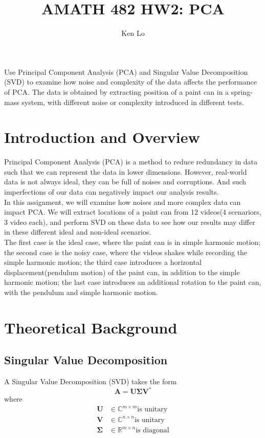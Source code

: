 \documentclass[12pt, a4paper]{article}
\begin{document}
\author{Ken Lo}
\title{AMATH 482 HW2: PCA}
\maketitle

\abstract
Use Principal Component Analysis (PCA) and Singular Value Decomposition (SVD) to examine how noise and complexity of the data affects the performance of PCA. The data is obtained by extracting position of a paint can in a spring-mass system, with different noise or complexity introduced in different tests.


\section{Introduction and Overview}
Principal Component Analysis (PCA) is a method to reduce redundancy in data such that we can represent the data in lower dimensions. However, real-world data is not always ideal, they can be full of noises and corruptions. And such imperfections of our data can negatively impact our analysis results.\\ 

In this assignment, we will examine how noises and more complex data can impact PCA. We will extract locations of a paint can from 12 videos(4 scenariors, 3 video each), and perform SVD on these data to see how our results may differ in these different ideal and non-ideal scenarios.\\

The first case is the ideal case, where the paint can is in simple harmonic motion; the second case is the noisy case, where the videos shakes while recording the simple harmonic motion; the third case introduces a horizontal displacement(pendulum motion) of the paint can, in addition to the simple harmonic motion; the last case introduces an additional rotation to the paint can, with the pendulum and simple harmonic motion.

\section{Theoretical Background}
\subsection{Singular Value Decomposition}
A Singular Value Decomposition (SVD) takes the form
$$\mathbf{A} = \mathbf{U\Sigma V^*}$$
where
\begin{align*}
\mathbf{U} &\in \mathbb{C}^{m\times m} \text{is unitary}\\
\mathbf{V} &\in \mathbb{C}^{n \times n} \text{is unitary}\\
\mathbf{\Sigma} &\in \mathbb{R}^{m \times n} \text{is diagonal}
\end{align*}
\end{document}
